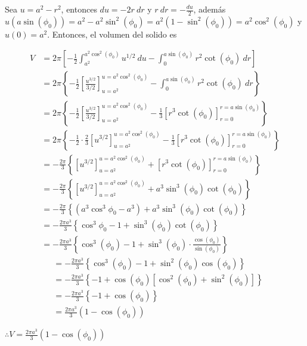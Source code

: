 \documentclass[12pt]{exam}
\begin{document}
\begin{questions}
  Sea $u = a^2-r^2$, entonces $du=-2r~dr$ y $r~dr= -\frac{du}{2}$, además $u(a\sin{(\phi_0)}) = a^2 - a^2\sin^2{(\phi_0)} = 
  a^2(1-\sin^2{(\phi_0)}) = a^2\cos^2{(\phi_0)}$ y $u(0) = a^2$. Entonces, el volumen del solido es

  \begin{align*}
    V 
    &= 2\pi \left[-\frac{1}{2}\int_{a^2}^{a^2\cos^2{(\phi_0)}}  u^{1/2} ~du - \int_0^{a\sin{(\phi_0)}}r^2 \cot{(\phi_0)} ~ dr \right]\\
    &= 2\pi \left\{-\frac{1}{2} \left[\frac{u^{3/2}}{3/2}\right]_{u=a^2}^{u=a^2\cos^2{(\phi_0)}}- \int_0^{a\sin{(\phi_0)}}r^2 \cot{(\phi_0)} ~ dr \right\}\\
    &= 2\pi \left\{-\frac{1}{2} \left[\frac{u^{3/2}}{3/2}\right]_{u=a^2}^{u=a^2\cos^2{(\phi_0)}}- \frac{1}{3}\left[r^3 \cot{(\phi_0)}\right]_{r=0}^{r=a\sin{(\phi_0)}} \right\}\\
    &= 2\pi \left\{-\frac{1}{2} \cdot \frac{2}{3}\left[u^{3/2}\right]_{u=a^2}^{u=a^2\cos^2{(\phi_0)}}- \frac{1}{3}\left[r^3 \cot{(\phi_0)}\right]_{r=0}^{r=a\sin{(\phi_0)}} \right\}\\
    &= -\frac{2\pi}{3} \left\{\left[u^{3/2}\right]_{u=a^2}^{u=a^2\cos^2{(\phi_0)}} + \left[r^3 \cot{(\phi_0)}\right]_{r=0}^{r=a\sin{(\phi_0)}} \right\}\\
    &= -\frac{2\pi}{3} \left\{\left[u^{3/2}\right]_{u=a^2}^{u=a^2\cos^2{(\phi_0)}} + a^3\sin^3{(\phi_0)} \cot{(\phi_0)} \right\}\\
    &= -\frac{2\pi}{3} \left\{(a^3\cos^3{\phi_0}-a^3) + a^3\sin^3{(\phi_0)} \cot{(\phi_0)} \right\}\\
    &= -\frac{2\pi a^3}{3} \left\{\cos^3{\phi_0}-1 + \sin^3{(\phi_0)} \cot{(\phi_0)} \right\}\\
    &= -\frac{2\pi a^3}{3} \left\{\cos^3{(\phi_0)}-1 + \sin^3{(\phi_0)}\cdot\frac{\cos{(\phi_0)}}{\sin{(\phi_0)}} \right\}
  \end{align*}
  \begin{align*}
    &= -\frac{2\pi a^3}{3} \left\{\cos^3{(\phi_0)}-1 + \sin^2{(\phi_0)}\cos{(\phi_0)} \right\}\\
    &= -\frac{2\pi a^3}{3} \left\{-1+\cos{(\phi_0)}[\cos^2{(\phi_0)} +\sin^2{(\phi_0)}]\right\}\\
    &= -\frac{2\pi a^3}{3} \left\{-1+\cos{(\phi_0)}\right\}\\
    &= \frac{2 \pi a^3}{3} (1 - \cos{(\phi_0)})
  \end{align*}

  $\therefore V = \frac{2 \pi a^3}{3} (1 - \cos{(\phi_0)})$


\end{questions}
\end{document}
